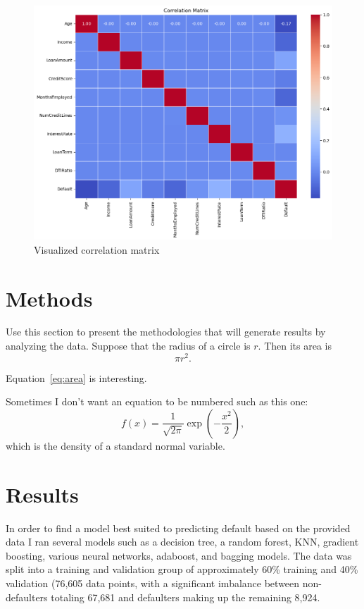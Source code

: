 \documentclass[12pt]{article}
\begin{document}
\begin{figure}[htbp]
    \centering
    \includegraphics[width=\linewidth]{./code/fancycorrelationmatrix.png}
    \caption{Visualized correlation matrix}
    \label{fig:corrmatrix}
\end{figure}

\section{Methods}
\label{sec:meth}

Use this section to present the methodologies that will generate results by
analyzing the data. Suppose that the radius of a circle is $r$. Then its area is
\begin{equation}
  \label{eq:area}
  \pi r^2.
\end{equation}

Equation~\eqref{eq:area} is interesting.

Sometimes I don't want an equation to be numbered such as this one:
\[
  f(x) = \frac{1}{\sqrt{2\pi}} \exp\left( - \frac{x^2}{2} \right),
\]
which is the density of a standard normal variable.



\section{Results}
\label{sec:resu}

In order to find a model best suited to predicting default based on the provided data I ran several models such as a decision tree, a random forest, KNN, gradient boosting, various neural networks, adaboost, and bagging models. The data was split into a training and validation group of approximately 60\% training and 40\% validation (76,605 data points, with a significant imbalance between non-defaulters totaling 67,681 and defaulters making up the remaining 8,924.
\end{document}
